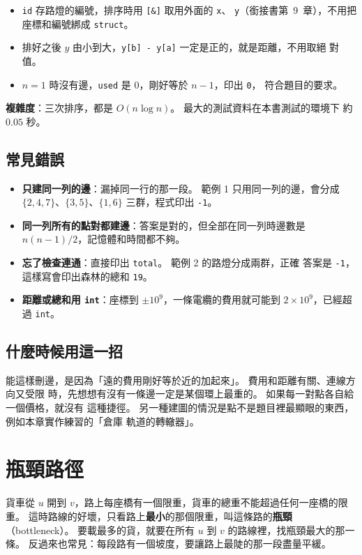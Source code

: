 \begin{itemize}
\item \texttt{id} 存路燈的編號，排序時用 \texttt{[\&]} 取用外面的 \texttt{x}、
\texttt{y}（銜接書第~9~章），不用把座標和編號綁成 \texttt{struct}。
\item 排好之後 $y$ 由小到大，\texttt{y[b] - y[a]} 一定是正的，就是距離，不用取絕
對值。
\item $n = 1$ 時沒有邊，\texttt{used} 是 $0$，剛好等於 $n - 1$，印出 \texttt{0}，
符合題目的要求。
\end{itemize}

\textbf{複雜度}：三次排序，都是 $O(n \log n)$。 最大的測試資料在本書測試的環境下
約 $0.05$ 秒。

\subsection{常見錯誤}

\begin{itemize}
\item \textbf{只建同一列的邊}：漏掉同一行的那一段。 範例 1 只用同一列的邊，會分成
$\{2, 4, 7\}$、$\{3, 5\}$、$\{1, 6\}$ 三群，程式印出 \texttt{-1}。
\item \textbf{同一列所有的點對都建邊}：答案是對的，但全部在同一列時邊數是
$n(n - 1)/2$，記憶體和時間都不夠。
\item \textbf{忘了檢查連通}：直接印出 \texttt{total}。 範例 2 的路燈分成兩群，正確
答案是 \texttt{-1}，這樣寫會印出森林的總和 \texttt{19}。
\item \textbf{距離或總和用 \texttt{int}}：座標到 $\pm 10^9$，一條電纜的費用就可能到
$2 \times 10^9$，已經超過 \texttt{int}。
\end{itemize}

\subsection{什麼時候用這一招}

能這樣刪邊，是因為「遠的費用剛好等於近的加起來」。 費用和距離有關、連線方向又受限
時，先想想有沒有一條邊一定是某個環上最重的。 如果每一對點各自給一個價格，就沒有
這種捷徑。 另一種建圖的情況是點不是題目裡最顯眼的東西，例如本章實作練習的「倉庫
軌道的轉轍器」。

\section{瓶頸路徑}
\label{sec:bottleneck}

貨車從 $u$ 開到 $v$，路上每座橋有一個限重，貨車的總重不能超過任何一座橋的限重。
這時路線的好壞，只看路上\textbf{最小}的那個限重，叫這條路的\textbf{瓶頸}
（bottleneck）。 要載最多的貨，就要在所有 $u$ 到 $v$ 的路線裡，找瓶頸最大的那一
條。 反過來也常見：每段路有一個坡度，要讓路上最陡的那一段盡量平緩。

